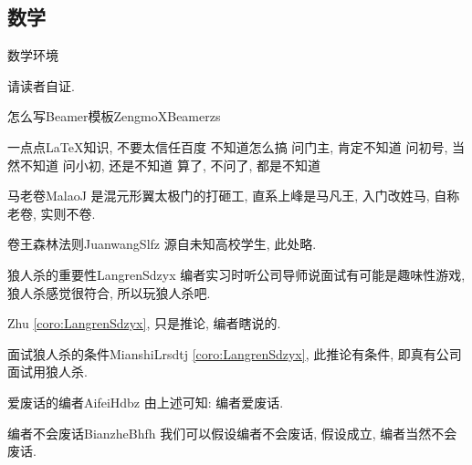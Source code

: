 \documentclass[hyperref,UTF8,11pt]{beamer}
\begin{document}
\subsection{数学}
\begin{frame}{数学环境}
	\begin{SCUproof}{}
		请读者自证.
	\end{SCUproof}
	\begin{SCUalgorithm}{怎么写Beamer模板}{ZengmoXBeamerzs}
		\begin{algorithmic}[1]
		\REQUIRE 一点点\LaTeX 知识, 不要太信任百度
		\ENSURE 不知道怎么搞
		\STATE 问门主, 肯定不知道
		\STATE 问初号, 当然不知道
		\STATE 问小初, 还是不知道
		\RETURN 算了, 不问了, 都是不知道
		\end{algorithmic}
	\end{SCUalgorithm}
	\begin{SCUdefinition}{马老卷}{MalaoJ}
		是混元形翼太极门的打砸工, 直系上峰是马凡王, 入门改姓马, 自称老卷, 实则不卷.
	\end{SCUdefinition}
	\begin{SCUlemma}{卷王森林法则}{JuanwangSlfz}
		源自未知高校学生, 此处略.
	\end{SCUlemma}
	\begin{SCUcorollary}{狼人杀的重要性}{LangrenSdzyx}
		编者实习时听公司导师说面试有可能是趣味性游戏, 狼人杀感觉很符合, 所以玩狼人杀吧.
	\end{SCUcorollary}
	\begin{SCUremark}{}{Zhu}
		\vref{coro:LangrenSdzyx}, 只是推论, 编者瞎说的.
	\end{SCUremark}
	\begin{SCUcondition}{面试狼人杀的条件}{MianshiLrsdtj}
		\vref{coro:LangrenSdzyx}, 此推论有条件, 即真有公司面试用狼人杀.
	\end{SCUcondition}
	\begin{SCUconclusion}{爱废话的编者}{AifeiHdbz}
		由上述可知: 编者爱废话.
	\end{SCUconclusion}
	\begin{SCUassumption}{编者不会废话}{BianzheBhfh}
		我们可以假设编者不会废话, 假设成立, 编者当然不会废话.
	\end{SCUassumption}
\end{frame}
\end{document}
